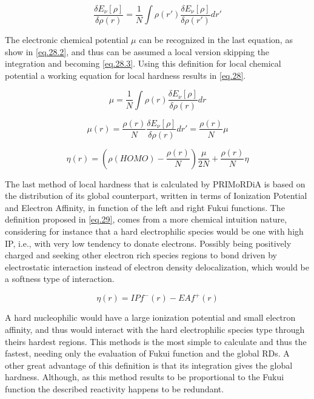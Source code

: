 \documentclass[a4paper,11pt]{refart}
\begin{document}
\begin{equation}
\frac{\delta E_\nu[\rho]}{\delta \rho(r)} = \frac{1}{N} \int \rho(r') \frac{\delta E_\nu[\rho]}{\delta \rho(r')} dr'
\label{eq.28.1}
\end{equation}

The electronic chemical potential $\mu$ can be recognized in the last equation, as show in \autoref{eq.28.2}, and thus can be assumed a local version skipping the integration and becoming \autoref{eq.28.3}. Using this definition for local chemical potential a working equation for local hardness results in \autoref{eq.28}. 

\begin{equation}
\mu = \frac{1}{N} \int \rho(r) \frac{\delta E_\nu[\rho]}{\delta \rho(r)} dr
\label{eq.28.2}
\end{equation}


\begin{equation}
\mu(r) =  \frac{\rho(r)}{N} \frac{\delta E_\nu[\rho]}{\delta \rho(r)} dr'  = \frac{\rho(r)}{N} \mu
\label{eq.28.3}
\end{equation}


\begin{equation}
\eta(r) = \left (\rho(HOMO) - \frac{\rho(r)}{N} \right) \frac{\mu}{2N} + \frac{\rho(r)}{N}\eta
\label{eq.28}
\end{equation}

The last method of local hardness that is calculated by PRIMoRDiA is based on the distribution of its global counterpart, written in terms of Ionization Potential and Electron Affinity, in function of the left and right Fukui functions\cite{meneses2004proposal}. The definition proposed in \autoref{eq.29}, comes from a more chemical intuition nature, considering for instance that a hard electrophilic species would be one with high IP, i.e., with very low tendency to donate electrons. Possibly being positively charged and seeking other electron rich species regions to bond driven by electrostatic interaction instead of electron density delocalization, which would be a softness type of interaction.

\begin{equation}
\eta(r) = IP f^-(r) - EA f^+(r)
\label{eq.29} 
\end{equation}

A hard nucleophilic would have a large ionization potential and small electron affinity, and thus would interact with the hard electrophilic species type through theirs hardest regions. This methods is the most simple to calculate and thus the fastest, needing only the evaluation of Fukui function and the global RDs. A other great advantage of this definition is that its integration gives the global hardness. Although, as this method results to be proportional to the Fukui function the described reactivity happens to be redundant. 
 
\end{document}

